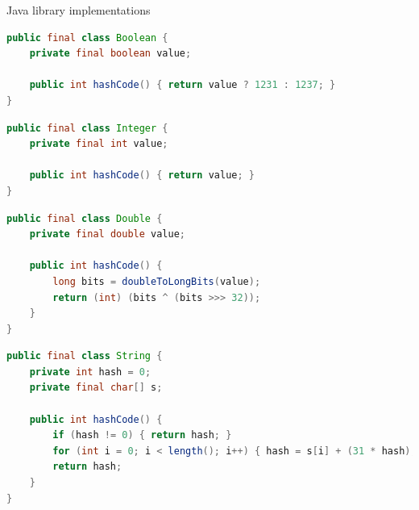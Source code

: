 \documentclass[8pt,a4paper,compress]{beamer}
\begin{document}
\begin{frame}[fragile]
\pause

Java library implementations
\begin{lstlisting}[language=Java]
public final class Boolean {
    private final boolean value;

    public int hashCode() { return value ? 1231 : 1237; }
}
\end{lstlisting}

\pause

\begin{lstlisting}[language=Java]
public final class Integer {
    private final int value;

    public int hashCode() { return value; }
}
\end{lstlisting}

\pause

\begin{lstlisting}[language=Java]
public final class Double {
    private final double value;

    public int hashCode() {
        long bits = doubleToLongBits(value);
        return (int) (bits ^ (bits >>> 32));
    }
}
\end{lstlisting}

\pause

\begin{lstlisting}[language=Java]
public final class String {
    private int hash = 0;
    private final char[] s;

    public int hashCode() {
        if (hash != 0) { return hash; }
        for (int i = 0; i < length(); i++) { hash = s[i] + (31 * hash); }
        return hash;
    }
} 
\end{lstlisting}
\end{frame}
\end{document}

